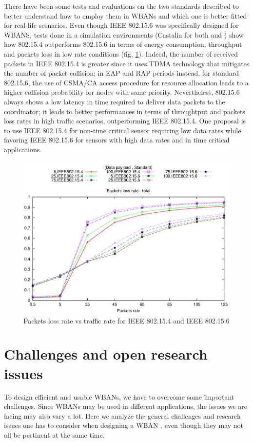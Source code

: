 \documentclass[conference]{IEEEtran}
\begin{document}
There have been some tests and evaluations on the two standards described to better understand how to employ them in WBANs and which one is better fitted for real-life scenarios. 
Even though IEEE 802.15.6 was specifically designed for WBANS, tests done in a simulation environments (Castalia for both \cite{nabila2019qos} and \cite{toumanari2014performance}) show how 802.15.4 outperforms 802.15.6 in terms of  energy consumption, throughput and packets loss in low rate conditions (fig. \ref{grafico}). Indeed, the number of received packets in IEEE 802.15.4 is greater since it uses TDMA technology that mitigates the number of packet collision; in EAP and RAP periods instead, for standard 802.15.6, the use of CSMA/CA access procedure for resource allocation leads to a higher collision probability for nodes with same priority.
Nevertheless, 802.15.6 always shows a low latency in time required to deliver data packets to the coordinator; it leads to better performances in terms of throughtput and packets loss rates in high traffic scenarios, outperforming IEEE 802.15.4. 
\newline One proposal \cite{nabila2019qos} is to use IEEE 802.15.4 for non-time critical sensor requiring low data rates while favoring IEEE 802.15.6 for sensors with high data rates and in time critical applications. 

\begin{figure}[htbp]
	\centering
	\includegraphics[width=0.9\linewidth]{img/grafico.png}
	\caption{Packets loss rate vs traffic rate for IEEE 802.15.4 and IEEE 802.15.6}
	\label{grafico}
\end{figure}

\section{Challenges and open research issues}
To design efficient and usable WBANs, we have to overcome some important challenges. Since WBANs may be used in different applications, the issues we are facing may also vary a lot. Here we analyze the general challenges and research issues one has to consider when designing a WBAN \cite{cao2009enabling}, even though they may not all be pertinent at the same time.
\end{document}
